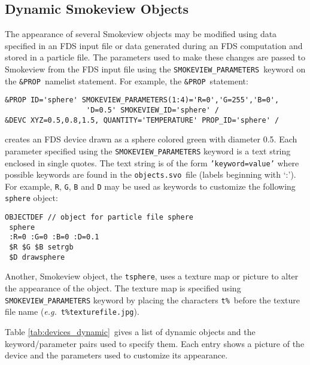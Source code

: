 %
\subsection{Dynamic Smokeview Objects}
The appearance of several Smokeview objects may be modified using data specified in an FDS input 
file or data generated during an FDS computation and stored in a particle file. The parameters used to make these changes are passed 
to Smokeview from the FDS input file using the {\tt SMOKEVIEW\_PARAMETERS}\ keyword on the {\tt \&PROP}\ 
namelist statement.  For example, the {\tt \&PROP}\ statement:
\begin{verbatim}
&PROP ID='sphere' SMOKEVIEW_PARAMETERS(1:4)='R=0','G=255','B=0',
                   'D=0.5' SMOKEVIEW_ID='sphere' /
&DEVC XYZ=0.5,0.8,1.5, QUANTITY='TEMPERATURE' PROP_ID='sphere' /
\end{verbatim}
creates an FDS device drawn as a sphere colored green with diameter 0.5. Each parameter specified using the
{\tt SMOKEVIEW\_PARAMETERS} keyword
is a text string enclosed in single quotes.  The text string is of the form {\tt 'keyword=value'} where possible
keywords are found in the {\tt objects.svo}\ file (labels beginning with `:').  For example, {\tt R}, {\tt G},
{\tt B} and {\tt D} may be used as keywords to customize the following {\tt sphere} object:
\begin{verbatim}
OBJECTDEF // object for particle file sphere
 sphere
 :R=0 :G=0 :B=0 :D=0.1
 $R $G $B setrgb
 $D drawsphere
\end{verbatim}

Another, Smokeview object, the {\tt tsphere}, uses a texture map or picture to alter the appearance of the object.
The texture map is specified using {\tt SMOKEVIEW\_PARAMETERS} keyword by placing the characters {\tt t\%}\
before the texture file name ({\em e.g.}\ {\tt t\%texturefile.jpg}).

Table \ref{tab:devices_dynamic}\ gives a list of dynamic objects and the keyword/parameter pairs used to specify them.
Each entry shows a picture of the device and the parameters used to customize its appearance.

